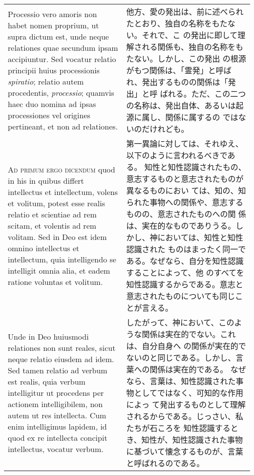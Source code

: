 \documentclass[10pt]{jsarticle} %
\begin{document}
\begin{longtable}{p{21em}p{21em}}
\\


Processio vero amoris non
habet nomen proprium, ut supra dictum est, unde neque relationes quae
secundum ipsam accipiuntur. Sed vocatur relatio principii huius
processionis {\itshape spiratio}; relatio autem procedentis, {\itshape processio}; quamvis
haec duo nomina ad ipsas processiones vel origines pertineant, et non ad
relationes.


&

他方、愛の発出は、前に述べられたとおり、独自の名称をもたない。それで、こ
 の発出に即して理解される関係も、独自の名称をもたない。しかし、この発出
 の根源がもつ関係は、「霊発」と呼ばれ、発出するものの関係は「発出」と呼
 ばれる。ただ、この二つの名称は、発出自体、あるいは起源に属し、関係に属するの
 ではないのだけれども。



\\



{\scshape Ad primum ergo dicendum} quod in his in quibus differt intellectus et
intellectum, volens et volitum, potest esse realis relatio et scientiae
ad rem scitam, et volentis ad rem volitam. Sed in Deo est idem omnino
intellectus et intellectum, quia intelligendo se intelligit omnia alia,
et eadem ratione voluntas et volitum. 

&

第一異論に対しては、それゆえ、以下のように言われるべきである。
知性と知性認識されたもの、意志するものと意志されたものが異なるものにおい
 ては、知の、知られた事物への関係や、意志するものの、意志されたものへの関
 係は、実在的なものでありうる。しかし、神においては、知性と知性認識された
 ものはまったく同一である。なぜなら、自分を知性認識することによって、他
 のすべてを知性認識するからである。意志と意志されたものについても同じこ
 とが言える。


\\


Unde in Deo huiusmodi relationes
non sunt reales, sicut neque relatio eiusdem ad idem. Sed tamen relatio
ad verbum est realis, quia verbum intelligitur ut procedens per actionem
intelligibilem, non autem ut res intellecta. Cum enim intelligimus
lapidem, id quod ex re intellecta concipit intellectus, vocatur verbum.


&

したがって、神において、このような関係は実在的でない。これは、自分自身へ
 の関係が実在的でないのと同じである。しかし、言葉への関係は実在的である。
 なぜなら、言葉は、知性認識された事物としてではなく、可知的な作用によっ
 て発出するものとして理解されるからである。じっさい、私たちが石ころを
 知性認識するとき、知性が、知性認識された事物に基づいて懐念するものが、言葉
 と呼ばれるのである。



\end{longtable}
\end{document}
